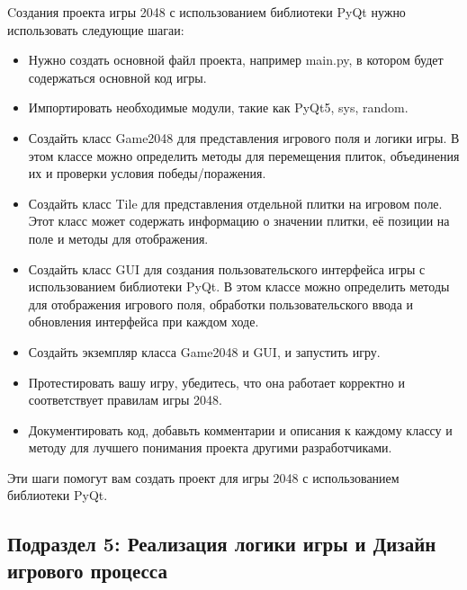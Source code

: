 Cоздания проекта игры 2048 с использованием библиотеки PyQt нужно использовать следующие шагаи:
\begin{itemize}
\item Нужно создать основной файл проекта, например main.py, в котором будет содержаться основной код игры.

\item Импортировать необходимые модули, такие как PyQt5, sys, random.

\item Создайть класс Game2048 для представления игрового поля и логики игры. В этом классе  можно определить методы для перемещения плиток, объединения их и проверки условия победы/поражения.

\item Создайть класс Tile для представления отдельной плитки на игровом поле. Этот класс может содержать информацию о значении плитки, её позиции на поле и методы для отображения.

\item Создайть класс GUI для создания пользовательского интерфейса игры с использованием библиотеки PyQt. В этом классе можно определить методы для отображения игрового поля, обработки пользовательского ввода и обновления интерфейса при каждом ходе.

\item Создайть экземпляр класса Game2048 и GUI, и запустить игру.

\item Протестировать вашу игру, убедитесь, что она работает корректно и соответствует правилам игры 2048.

\item Документировать код, добавьть комментарии и описания к каждому классу и методу для лучшего понимания проекта другими разработчиками.
\end{itemize}
Эти шаги помогут вам создать проект для игры 2048 с использованием библиотеки PyQt.

\subsection{\label{subsec:ch01/sec01/sub02}Подраздел 5: Реализация логики игры и Дизайн игрового процесса}

